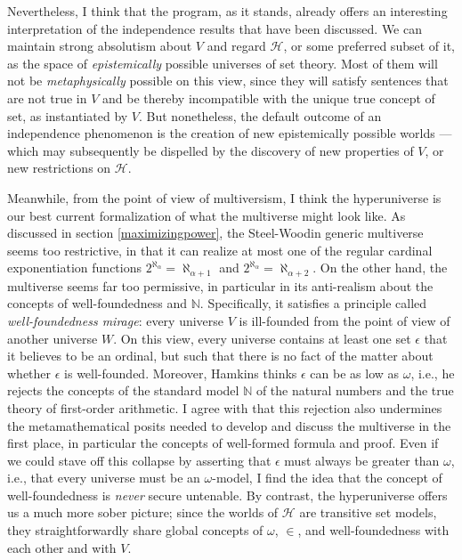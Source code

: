 \documentclass[letterpaper,12pt]{article}
\newcommand{\N}{\mathbb{N}}
\begin{document}
Nevertheless, I think that the program, as it stands, already offers an interesting interpretation of the independence results that have been discussed. We can maintain strong absolutism about $V$ and regard $\mathcal{H}$, or some preferred subset of it, as the space of \emph{epistemically} possible universes of set theory. Most of them will not be \emph{metaphysically} possible on this view, since they will satisfy sentences that are not true in $V$ and be thereby incompatible with the unique true concept of set, as instantiated by $V$. But nonetheless, the default outcome of an independence phenomenon is the creation of new epistemically possible worlds --- which may subsequently be dispelled by the discovery of new properties of $V$, or new restrictions on $\mathcal{H}$.

Meanwhile, from the point of view of multiversism, I think the hyperuniverse is our best current formalization of what the multiverse might look like. As discussed in section \ref{maximizingpower}, the Steel-Woodin generic multiverse seems too restrictive, in that it can realize at most one of the regular cardinal exponentiation functions $2^{\aleph_\alpha} = \aleph_{\alpha + 1}$ and $2^{\aleph_\alpha} = \aleph_{\alpha + 2}$. On the other hand, the \cite{hamkins2011set} multiverse seems far too permissive, in particular in its anti-realism about the concepts of well-foundedness and $\mathbb{N}$. Specifically, it satisfies a principle called \emph{well-foundedness mirage}: every universe $V$ is ill-founded from the point of view of another universe $W$. On this view, every universe contains at least one set $\epsilon$ that it believes to be an ordinal, but such that there is no fact of the matter about whether $\epsilon$ is well-founded. Moreover, Hamkins thinks $\epsilon$ can be as low as $\omega$, i.e., he rejects the concepts of the standard model $\N$ of the natural numbers and the true theory of first-order arithmetic. I agree with \cite{barton2016multiversism} that this rejection also undermines the metamathematical posits needed to develop and discuss the multiverse in the first place, in particular the concepts of well-formed formula and proof. Even if we could stave off this collapse by asserting that $\epsilon$ must always be greater than $\omega$, i.e., that every universe must be an $\omega$-model, I find the idea that the concept of well-foundedness is \emph{never} secure untenable. By contrast, the hyperuniverse offers us a much more sober picture; since the worlds of $\mathcal{H}$ are transitive set models, they straightforwardly share global concepts of $\omega$, $\in$, and well-foundedness with each other and with $V$.
\end{document}

